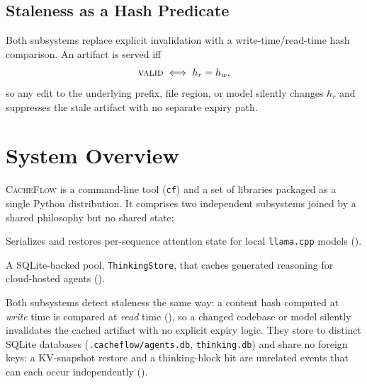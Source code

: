 \documentclass[10pt]{article}
\begin{document}
\subsection{Staleness as a Hash Predicate}
Both subsystems replace explicit invalidation with a write-time/read-time hash
comparison. An artifact is served iff
\begin{equation}
\textsc{valid} \iff h_r = h_w,
\label{eq:stale}
\end{equation}
so any edit to the underlying prefix, file region, or model silently changes
$h_r$ and suppresses the stale artifact with no separate expiry path.

\section{System Overview}
\label{sec:overview}

\textsc{CacheFlow} is a command-line tool (\texttt{cf}) and a set of libraries
packaged as a single Python distribution. It comprises two independent
subsystems joined by a shared philosophy but no shared state:

\begin{description}[leftmargin=1.1em,style=nextline]
  \item[Self-hosted KV engine] Serializes and restores per-sequence attention
  state for local \texttt{llama.cpp} models ().
  \item[Cloud output cache] A SQLite-backed pool, \texttt{ThinkingStore}, that
  caches generated reasoning for cloud-hosted agents ().
\end{description}

Both subsystems detect staleness the same way: a content hash computed at
\emph{write} time is compared at \emph{read} time (), so a
changed codebase or model silently invalidates the cached artifact with
no explicit expiry logic. They store to distinct SQLite databases
(\texttt{.cacheflow/agents.db}, \texttt{thinking.db}) and
share no foreign keys: a KV-snapshot restore and a thinking-block hit are
unrelated events that can each occur independently ().
\end{document}
